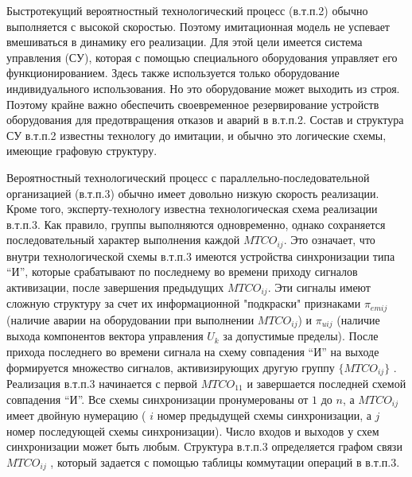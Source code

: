 \begin{SCn}
\end{SCn}


\begin{SCn}
\end{SCn}


Быстротекущий вероятностный технологический процесс (в.т.п.2) обычно выполняется с высокой скоростью. Поэтому имитационная модель не успевает вмешиваться в динамику его реализации. Для этой цели имеется система управления (СУ), которая с помощью специального оборудования управляет его функционированием. Здесь также используется только оборудование индивидуального использования. Но это оборудование может выходить из строя. Поэтому крайне важно обеспечить своевременное резервирование устройств оборудования для предотвращения отказов и аварий в в.т.п.2. Состав и структура СУ в.т.п.2 известны технологу до имитации, и обычно это логические схемы, имеющие графовую структуру.

Вероятностный технологический процесс с параллельно-последовательной организацией (в.т.п.3) обычно имеет довольно низкую скорость реализации. Кроме того, эксперту-технологу известна технологическая схема реализации в.т.п.3. Как правило, группы   выполняются одновременно, однако сохраняется последовательный характер выполнения каждой $MTCO_{ij}$. Это означает, что внутри технологической схемы в.т.п.3 имеются устройства синхронизации типа ``И'', которые срабатывают по последнему во времени приходу сигналов активизации, после завершения предыдущих $MTCO_{ij}$. Эти сигналы имеют сложную структуру за счет их информационной "подкраски"{} признаками $\pi_{emij}$ (наличие аварии на оборудовании при выполнении  $MTCO_{ij}$) и $\pi_{uij}$ (наличие выхода компонентов вектора управления ${U_k}$ за допустимые пределы). После прихода последнего во времени сигнала на схему совпадения ``И'' на выходе формируется множество сигналов, активизирующих другую группу $\{MTCO_{ij}\}$ . Реализация в.т.п.3 начинается с первой $MTCO_{11}$ и завершается последней схемой совпадения ``И''. Все схемы синхронизации пронумерованы от $1$ до $n$, а $MTCO_{ij}$ имеет двойную нумерацию ( $i$ номер предыдущей схемы синхронизации, а $j$ номер последующей схемы синхронизации). Число входов и выходов у схем синхронизации может быть любым. Структура в.т.п.3 определяется графом связи $MTCO_{ij}$ , который задается с помощью таблицы коммутации операций в в.т.п.3.

